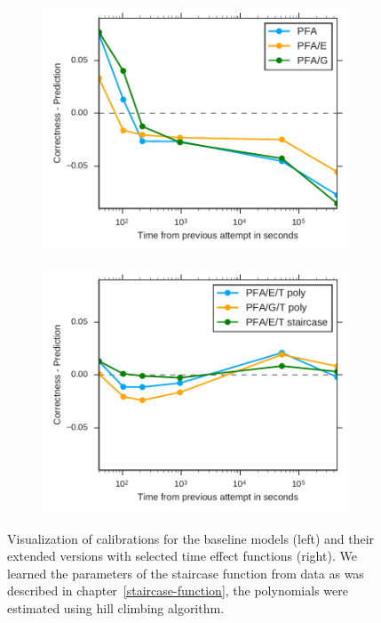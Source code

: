 \begin{figure}[htbp]
  \centering
  \begin{subfigure}{.49\textwidth}
    \centering
    \includegraphics[width=\textwidth]{img/calibration-time-effect-off}
    \caption{}
    \label{fig:calibration-time-effect-off}
  \end{subfigure}
  \begin{subfigure}{.49\textwidth}
    \centering
    \includegraphics[width=\textwidth]{img/calibration-time-effect-on}
    \caption{}
    \label{fig:calibration-time-effect-on}
  \end{subfigure}
  \label{fig:calibration1}
  \caption{Visualization of calibrations for the baseline models (left) and their extended versions with selected time effect functions (right). We learned the parameters of the staircase function from data as was described in chapter~\ref{staircase-function}, the polynomials were estimated using hill climbing algorithm.}
\end{figure}

